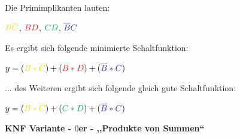 \documentclass{article}
\begin{document}
\begin{minipage}{.50\linewidth}
\begin{kvmap}
       \end{kvmap}
    \end{minipage} \\

Die Primimplikanten lauten:

$\textcolor{Yellow!90!black}{B \overline{C}}$, $\textcolor{Red}{B D}$, $\textcolor{Green}{C D}$, $\textcolor{Blue}{\overline{B} C}$

Es ergibt sich folgende minimierte Schaltfunktion:

$y=( \textcolor{Yellow!90!black}{B*\overline{C}}) + (\textcolor{Red}{B*D}) + (\textcolor{Blue}{\overline{B}*C})$

... des Weiteren ergibt sich folgende gleich gute Schaltfunktion:


$y=( \textcolor{Yellow!90!black}{B*\overline{C}}) + (\textcolor{Green}{C*D}) + (\textcolor{Blue}{\overline{B}*C})$


\textbf{KNF Variante - $0$er -  ,,Produkte von Summen``} \\
\end{document}
